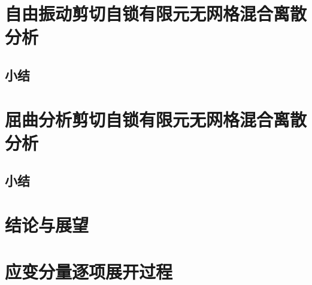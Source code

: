 \documentclass[internationalmaster]{hquThesis}
\begin{document}
\makecover

% 
% 

\frontmatter{
    
    \tableofcontents
}

\mainmatter




\chapter{自由振动剪切自锁有限元无网格混合离散分析}


\section{小结}


\chapter{屈曲分析剪切自锁有限元无网格混合离散分析}


\section{小结}


\chapter{结论与展望}


% 
\appendix
\chapter{应变分量逐项展开过程}
\label{app:strain-expansion}


\backmatter





\end{document}
